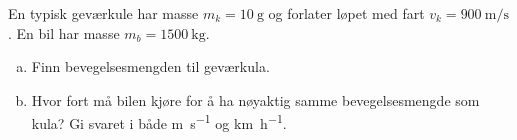 %
En typisk geværkule har masse $m_k = \SI{10}{\gram}$ og forlater løpet med fart $v_k = \SI{900}{\metre\per\second}$.
En bil har masse $m_b = \SI{1500}{\kilo\gram}$.
\begin{enumerate}[a)]
    \item Finn bevegelsesmengden til geværkula.
    \item Hvor fort må bilen kjøre for å ha nøyaktig samme bevegelsesmengde som kula?
          Gi svaret i både \si{\metre\per\second} og \si{\kilo\metre\per\hour}.
\end{enumerate}
